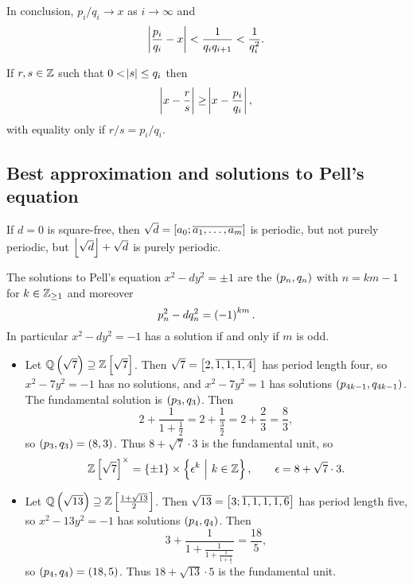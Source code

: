 In conclusion, $ p_i / q_i \to x $ as $ i \to \infty $ and
$$ \abs{\dfrac{p_i}{q_i} - x} < \dfrac{1}{q_iq_{i + 1}} < \dfrac{1}{q_i^2}. $$

\begin{theorem}
If $ r, s \in \mathbb{Z} $ such that $ 0 < \abs{s} \le q_i $ then
$$ \abs{x - \dfrac{r}{s}} \ge \abs{x - \dfrac{p_i}{q_i}}, $$
with equality only if $ r / s = p_i / q_i $.
\end{theorem}

\subsection{Best approximation and solutions to Pell's equation}

If $ d = 0 $ is square-free, then $ \sqrt{d} = \sbr{a_0; \overline{a_1, \dots, a_m}} $ is periodic, but not purely periodic, but $ \left\lfloor \sqrt{d} \right\rfloor + \sqrt{d} $ is purely periodic.

\begin{theorem}
The solutions to Pell's equation $ x^2 - dy^2 = \pm 1 $ are the $ \br{p_n, q_n} $ with $ n = km - 1 $ for $ k \in \mathbb{Z}_{\ge 1} $ and moreover
$$ p_n^2 - dq_n^2 = \br{-1}^{km}. $$
In particular $ x^2 - dy^2 = -1 $ has a solution if and only if $ m $ is odd.
\end{theorem}

\begin{example*}
\hfill
\begin{itemize}
\item Let $ \QQ\br{\sqrt{7}} \supseteq \ZZ\sbr{\sqrt{7}} $. Then $ \sqrt{7} = \sbr{2, \overline{1, 1, 1, 4}} $ has period length four, so $ x^2 - 7y^2 = -1 $ has no solutions, and $ x^2 - 7y^2 = 1 $ has solutions $ \br{p_{4k - 1}, q_{4k - 1}} $. The fundamental solution is $ \br{p_3, q_3} $. Then
$$ 2 + \dfrac{1}{1 + \tfrac{1}{2}} = 2 + \dfrac{1}{\tfrac{3}{2}} = 2 + \dfrac{2}{3} = \dfrac{8}{3}, $$
so $ \br{p_3, q_3} = \br{8, 3} $. Thus $ 8 + \sqrt{7} \cdot 3 $ is the fundamental unit, so
$$ \ZZ\sbr{\sqrt{7}}^\times = \cbr{\pm 1} \times \cbr{\epsilon^k \st k \in \ZZ}, \qquad \epsilon = 8 + \sqrt{7} \cdot 3. $$
\item Let $ \QQ\br{\sqrt{13}} \supseteq \ZZ\sbr{\tfrac{1 + \sqrt{13}}{2}} $. Then $ \sqrt{13} = \sbr{3; \overline{1, 1, 1, 1, 6}} $ has period length five, so $ x^2 - 13y^2 = -1 $ has solutions $ \br{p_4, q_4} $. Then
$$ 3 + \dfrac{1}{1 + \tfrac{1}{1 + \tfrac{1}{1 + \tfrac{1}{1}}}} = \dfrac{18}{5}, $$
so $ \br{p_4, q_4} = \br{18, 5} $. Thus $ 18 + \sqrt{13} \cdot 5 $ is the fundamental unit.
\end{itemize}
\end{example*}

